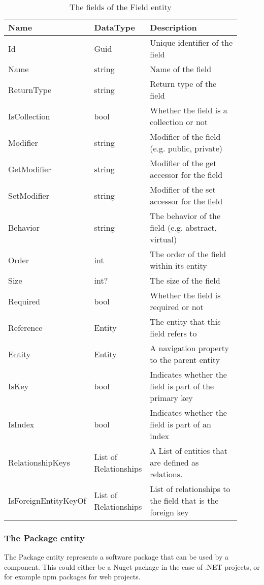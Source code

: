 \begin{table}[H]
\small
\begin{tabular}{ p{0.23\linewidth} p{0.23\linewidth} p{0.45\linewidth} }
\hline
\textbf{Name} & \textbf{DataType} & \textbf{Description} \\
\hline
Id & Guid & Unique identifier of the field \\
Name & string & Name of the field \\
ReturnType & string & Return type of the field \\
IsCollection & bool & Whether the field is a collection or not \\
Modifier & string & Modifier of the field (e.g. public, private) \\
GetModifier & string & Modifier of the get accessor for the field \\
SetModifier & string & Modifier of the set accessor for the field \\
Behavior & string & The behavior of the field (e.g. abstract, virtual) \\
Order & int & The order of the field within its entity \\
Size & int? & The size of the field \\
Required & bool & Whether the field is required or not \\
Reference & Entity & The entity that this field refers to\\
Entity & Entity & A navigation property to the parent entity \\
IsKey & bool & Indicates whether the field is part of the primary key \\
IsIndex & bool & Indicates whether the field is part of an index \\
RelationshipKeys & List of Relationships & A List of entities that are defined as relations. \\
IsForeignEntityKeyOf & List of Relationships & List of relationships to the field that is the foreign key \\
\hline
\end{tabular}
\caption{The fields of the Field entity}
\label{table:field_entity}
\end{table}

\subsubsection{The Package entity}

The Package entity represents a software package that can be used by a component. This
could either be a Nuget package in the case of .NET projects, or for example npm packages
for web projects.

